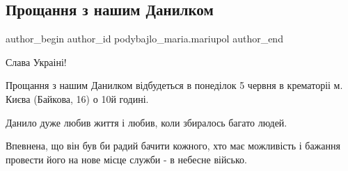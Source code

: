  
 
 
 
 

\subsection{Прощання з нашим Данилком}
\label{sec:04_06_2023.fb.podybajlo_maria.mariupol.1.proschannja_z_nashym_danylkom}

\ifcmt
 author_begin
   author_id podybajlo_maria.mariupol
 author_end
\fi

Слава Украіні!

Прощання з нашим Данилком відбудеться в понеділок 5 червня в крематоріі м.
Києва (Байкова, 16) о 10й годині.

Данило дуже любив життя і любив, коли збиралось багато людей. 

Впевнена, що він був би радий бачити кожного, хто має можливість і бажання
провести його на нове місце служби - в небесне військо.
